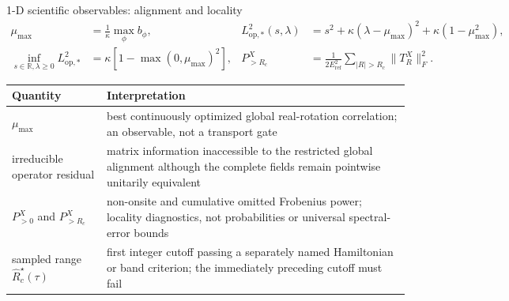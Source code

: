 \documentclass[aspectratio=169,10pt]{beamer}
\begin{document}
\begin{frame}{1-D scientific observables: alignment and locality}
  \small
  \begin{align*}
    \mu_{\max}&=\frac{1}{\kappa}\max_{\phi} b_\phi,
    &
    L_{\mathrm{op},*}^2(s,\lambda)
      &=s^2+\kappa(\lambda-\mu_{\max})^2
        +\kappa(1-\mu_{\max}^2),\\
    \inf_{s\in\mathbb R,\lambda\ge0}L_{\mathrm{op},*}^2
      &=\kappa\!\left[1-\max(0,\mu_{\max})^2\right],
    &
    P_{>R_c}^{X}
      &=\frac{1}{2E_{\mathrm{ref}}^2}\sum_{|R|>R_c}\|T_R^X\|_F^2.
  \end{align*}
  \begin{tabular}{p{}p{}}
    \toprule
    Quantity & Interpretation\\
    \midrule
    $\mu_{\max}$
      & best continuously optimized global real-rotation correlation; an observable,
        not a transport gate\\[0.5em]
    irreducible operator residual
      & matrix information inaccessible to the restricted global alignment although the
        complete fields remain pointwise unitarily equivalent\\[0.5em]
    $P_{>0}^{X}$ and $P_{>R_c}^{X}$
      & non-onsite and cumulative omitted Frobenius power; locality diagnostics, not
        probabilities or universal spectral-error bounds\\[0.5em]
    sampled range $\widehat R_c^\star(\tau)$
      & first integer cutoff passing a separately named Hamiltonian or band criterion;
        the immediately preceding cutoff must fail\\
    \bottomrule
  \end{tabular}
\end{frame}
\end{document}

